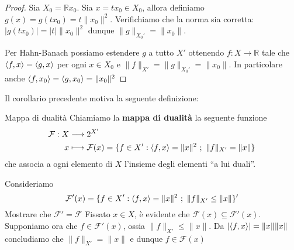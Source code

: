 \begin{proof}{}
    Sia \(X_{0} = \mathbb{R}x_{0}\). Sia \(x = tx_{0} \in X_{0}\), allora
    definiamo \(g{(x)} = g{(tx_{0})} = t\|x_{0}\|^2\). Verifichiamo che la norma
    sia corretta: \(|g{(tx_{0})}| = |t| \|x_{0}\|^2\) dunque \(\|g\|_{X_{0}'} = \|x_{0}\| \).

    Per Hahn-Banach possiamo estendere \(g\) a tutto \(X'\) ottenendo \(f : X \to \mathbb{R}\) tale che \({\left\langle f, x\right\rangle} = {\left\langle g, x\right\rangle} \) per ogni \(x \in X_{0}\) e \(\|f\|_{X'}  = \|g\|_{X_{0}'} =\|x_{0}\| \). In particolare anche \({\left\langle f, x_{0}\right\rangle}  = {\left\langle g, x_{0}\right\rangle}  = \|x_{0}\|^2\) 
\end{proof}

Il corollario precedente motiva la seguente definizione:
\begin{definition}{Mappa di dualità}
    Chiamiamo la \textbf{mappa di dualità} la seguente funzione
    \begin{align*}
        \mathcal{F}: X &\longrightarrow 2^{X'} \\
        x &\longmapsto \mathcal{F}(x) = \{f \in X' : {\left\langle f, x\right\rangle} =
        \|x\|^2 \,\, ; \,\, \|f\|_{X'} = \|x\|\} 
    \end{align*}
    che associa a ogni elemento di \(X\) l'insieme degli elementi ``a lui duali''.
\end{definition}

\begin{eser}{}
    Consideriamo 
    \[
      \mathcal{F}'{(x)} = \{f \in X' : {\left\langle f, x\right\rangle} = \|x \|^2 \,\, ; \,\,
      \|f\|_{X'} \le \|x\|\} '
    \]
    Mostrare che \(\mathcal{F}' = \mathcal{F}\) 
    \tcblower
    Fissato \(x \in X\), è evidente che \(\mathcal{F}{(x)} \subseteq \mathcal{F}'{(x)} \). Supponiamo ora che \(f \in \mathcal{F}'{(x)}\), ossia \(\|f\|_{X'} \le \|x\|\). Da \(|{\left\langle f, x\right\rangle}| = \|x\| \|x\| \) concludiamo che \(\|f\|_{X'} = \|x\|\) e dunque \(f \in \mathcal{F}{(x)}\) 
\end{eser}

